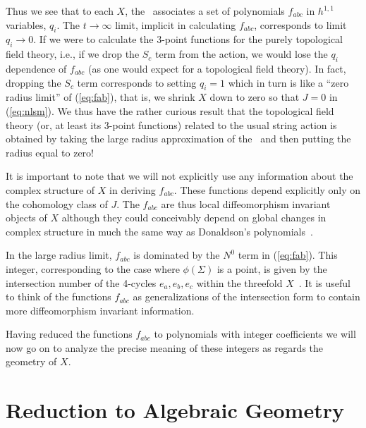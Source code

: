 Thus we see that to each $X$, the \nlsm\ associates a set of
polynomials $f_{abc}$ in $h^{1,1}$ variables, $q_i$. The $t\to\infty$
limit, implicit in calculating $f_{abc}$, corresponds to limit
$q_i\to0$. If we were to calculate the 3-point functions for the
purely topological field theory, i.e., if we drop the $S_c$ term from
the action, we would lose the $q_i$ dependence of $f_{abc}$ (as one
would expect for a topological field theory). In fact, dropping the
$S_c$ term corresponds to setting $q_i=1$ which in turn is like a
``zero radius limit'' of (\ref{eq:fab}), that is, we shrink $X$ down
to zero so that $J=0$ in (\ref{eq:nlsm}). We thus have the rather
curious result that the topological field theory (or, at least its
3-point functions) related to the usual
string action is obtained by taking the large radius approximation of
the \nlsm\ and then putting the radius equal to zero!

It is important to note that we will not explicitly use any
information about the complex structure of $X$ in deriving $f_{abc}$.
These functions depend explicitly only on the cohomology class of $J$.
The $f_{abc}$ are thus local diffeomorphism invariant objects of $X$
although they could conceivably depend on global changes in complex
structure in much the same way as Donaldson's polynomials~\cite{Don:poly}.

In the large radius limit, $f_{abc}$ is dominated by the $N^0$ term in
(\ref{eq:fab}). This integer, corresponding to the case where
$\phi(\Sigma)$ is a point, is given by the intersection number of the
4-cycles $e_a,e_b,e_c$ within the threefold $X$~\cite{W:aspects}. It is
useful to think of the functions $f_{abc}$ as generalizations of the
intersection form to contain more diffeomorphism invariant information.

Having reduced the functions $f_{abc}$ to polynomials with integer
coefficients we will now go on to analyze the precise meaning of these
integers as regards the geometry of $X$.


\section{Reduction to Algebraic Geometry}

